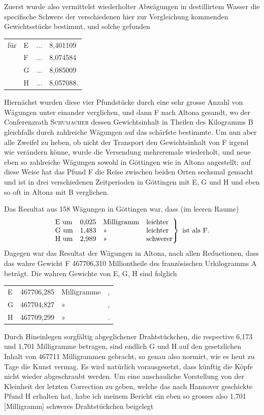 Zuerst wurde also vermittelst wiederholter Abwägungen in destillirtem
Wasser die specifische Schwere der verschiedenen hier zur Vergleichung kommenden
Gewichtsstücke bestimmt, und solche gefunden
\begin{center}
\begin{tabular}{@{}rlcl@{}}
für & E & .\quad.\quad. & 8,401109\\
    & F & .\quad.\quad. & 8,074584\\
    & G & .\quad.\quad. & 8,085009\\
    & H & .\quad.\quad. & 8,057088.
\end{tabular}
\end{center}

\clearpage{}
Hiernächst wurden diese vier Pfundstücke durch eine sehr grosse Anzahl
von Wägungen unter einander verglichen, und dann F nach Altona gesandt,
wo der Conferenzrath \textsc{Schumacher} dessen Gewichtsinhalt in Theilen des Kilogramms
B gleichfalls durch zahlreiche Wägungen auf das schärfste bestimmte.
Um nun aber alle Zweifel zu heben, ob nicht der Transport den Gewichtsinhalt
von F irgend wie verändern könne, wurde die Versendung mehreremale
wiederholt, und neue eben so zahlreiche Wägungen sowohl in Göttingen wie
in Altona angestellt; auf diese Weise hat das Pfund F die Reise zwischen
beiden Orten sechsmal gemacht und ist in drei verschiedenen Zeitperioden in
Göttingen mit E, G und H und eben so oft in Altona mit B verglichen.

Das Resultat aus 158 Wägungen in Göttingen war, dass (im leeren Raume)
\[
\left.\begin{array}{@{}lrl l@{}}
\text{E um}&0{,}025&\text{Milligramm}&\text{leichter}\\
\text{G um}&1{,}483&\text{»}&\text{leichter}\\
\text{H um}&2{,}989&\text{»}&\text{schwerer}
\end{array}\right\}\ \text{ist als F.}
\]
\noindent Dagegen war das Resultat der Wägungen in Altona, nach allen Reductionen,
dass das wahre Gewicht F 467706,310 Milliontheile des französischen Urkilogramms
A beträgt. Die wahren Gewichte von E, G, H sind folglich
\begin{center}
\begin{tabular}{@{}lrlr@{}}
E & 467706,285 & Milligramme & ,\\
G & 467704,827 & » & ,\\
H & 467709,299 & » & .
\end{tabular}
\end{center}
\noindent\hspace*{\parindent}Durch Hineinlegen sorgfältig abgeglichener Drahtstückchen, die respective
6,173 und 1,701 Milligramme betragen, sind endlich G und H auf den gesetzlichen
Inhalt von 467711 Milligrammen gebracht, so genau also normirt,
wie es heut zu Tage die Kunst vermag. Es wird natürlich vorausgesetzt, dass
künftig die Köpfe nicht wieder abgeschraubt werden. Um eine anschauliche
Vorstellung von der Kleinheit der letzten Correction zu geben, welche das
nach Hannover geschickte Pfund H erhalten hat, habe ich meinem Bericht
ein eben so grosses also 1,701 [Milligramm] schweres Drahtstückchen beigelegt

